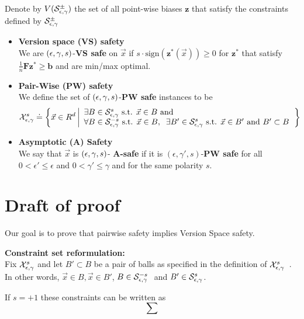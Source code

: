 \documentclass{article}
\newcommand{\X}{{\cal X}}
\newcommand{\x}{\vec{x}}
\newcommand{\vF}{\mathbf{F}}
\newcommand{\vb}{\mathbf{b}}
\newcommand{\vz}{\mathbf{z}}
\newcommand{\sign}{\text{sign}}
\begin{document}
Denote by $V({\cal S}_{\epsilon,\gamma}^{\pm})$ the set of all point-wise biases $\vz$
that satisfy the constraints defined by ${\cal S}_{\epsilon,\gamma}^{\pm}$

\newcommand{\XepsGamSig}{\X_{\epsilon,\edge}^{s}}
\newcommand{\XepsGam}{\X_{\epsilon,\edge}}
\newcommand{\XpesGamPol}{\X_{\epsilon,\edge}^{\mbox{pol}}}

\begin{itemize}
\item {\bf Version space (VS) safety}\\
We are $(\epsilon,\gamma,s)$-{\bf VS safe} on $\x$ if $s\cdot\sign(\vz^*(\x)) \geq 0$
for $\vz^*$ that satisfy  $\frac{1}{n} \vF \vz^* \geq \vb$ and are
min/max optimal.

\item
{\bf Pair-Wise (PW) safety}\\
We define the set of $(\epsilon,\gamma,s)$-{\bf PW safe} instances
to be 
\[
\XepsGamSig \doteq \left\{\x \in R^d \left|
\begin{array}{l}
\exists B \in \SepsGamSig \mbox{ s.t. } \x \in B \mbox{ and } \\
\forall B \in \SepsGamMinusSig \mbox{ s.t. } \x \in B,\;\;
\exists B' \in \SepsGamSig \mbox{ s.t. } \x \in B' \mbox{ and } B'
\subset B
\end{array}
\right. \right\}
\]

\item
{\bf Asymptotic (A) Safety}\\ We say that $\x$ is $(\epsilon,\gamma,s)$- {\bf A-safe} if
it is $(\epsilon,\gamma',s)$-{\bf PW safe} for all $0<\epsilon' \leq
\epsilon$ and $0<\gamma' \leq \gamma$ and for the same polarity $s$.
\end{itemize}


\section{Draft of proof}

Our goal is to prove that pairwise safety implies Version Space
safety.

{\bf Constraint set reformulation:}\\
Fix $\XepsGamSig$ and let $B' \subset B$ be a pair of balls as
specified in the definition of $\XepsGamSig$\ . In other words, $\x \in
B, \x \in B'$, $B \in {\cal S}_{\epsilon,\gamma}^{-s}\ $ and $B' \in {\cal S}_{\epsilon,\gamma}^{s}$.

If $s=+1$ these constraints can be written as
\[
\sum
\]
\end{document}

